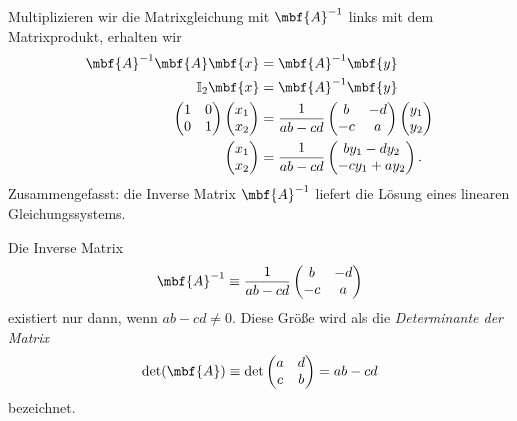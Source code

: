 Multiplizieren wir die Matrixgleichung mit $\mbf{A}^{-1}$ links mit dem Matrixprodukt, erhalten wir
\begin{equation}
	\begin{split}
		\mbf{A}^{-1}\mbf{A}\mbf{x} &= \mbf{A}^{-1}\mbf{y} \\
		\mathbb{I}_2 \mbf{x} &= \mbf{A}^{-1}\mbf{y} \\ 
		\begin{pmatrix}
	1 & 0\\ 0 & 1
	\end{pmatrix} \begin{pmatrix}
		x_1\\ x_2
	\end{pmatrix} &= \frac{1}{ab-cd} \begin{pmatrix}
	b & -d \\ -c & a
	\end{pmatrix} \begin{pmatrix}
		y_1 \\ y_2
	\end{pmatrix} \\
	\begin{pmatrix}
		x_1\\ x_2
	\end{pmatrix} &= \frac{1}{ab-cd} \begin{pmatrix}
		by_1 - dy_2 \\ -cy_1 + ay_2
	\end{pmatrix}.
	\end{split}
\end{equation}
Zusammengefasst: die Inverse Matrix $\mbf{A}^{-1}$ liefert die Lösung eines linearen Gleichungssystems.

Die Inverse Matrix 
\begin{equation}\label{eq:22inverse}
	\mbf{A}^{-1} \equiv \frac{1}{ab-cd} \begin{pmatrix}
	b & -d \\ -c & a
	\end{pmatrix}
\end{equation}
existiert nur dann, wenn $ab-cd\not=0$. Diese Größe wird als die \emph{Determinante der Matrix}
\begin{equation}
	\det(\mbf{A}) \equiv \det \begin{pmatrix}
		a & d \\ c & b
	\end{pmatrix} = ab-cd
\end{equation}
bezeichnet.


